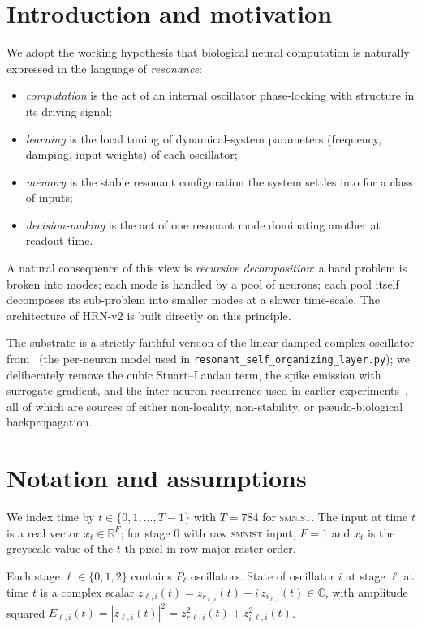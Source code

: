 \documentclass[11pt]{article}
\newcommand{\R}{\mathbb{R}}
\newcommand{\C}{\mathbb{C}}
\newcommand{\zr}{z_r}
\newcommand{\zi}{z_i}
\begin{document}
\section{Introduction and motivation}

We adopt the working hypothesis that biological neural computation is
naturally expressed in the language of \emph{resonance}:
\begin{itemize}[itemsep=2pt]
\item \emph{computation} is the act of an internal oscillator phase-locking
      with structure in its driving signal;
\item \emph{learning} is the local tuning of dynamical-system parameters
      (frequency, damping, input weights) of each oscillator;
\item \emph{memory} is the stable resonant configuration the system
      settles into for a class of inputs;
\item \emph{decision-making} is the act of one resonant mode dominating
      another at readout time.
\end{itemize}

A natural consequence of this view is \emph{recursive decomposition}:
a hard problem is broken into modes; each mode is handled by a pool of
neurons; each pool itself decomposes its sub-problem into smaller modes
at a slower time-scale. The architecture of HRN-v2 is built directly on
this principle.

The substrate is a strictly faithful version of the linear damped complex
oscillator from~\cite{pubv3} (the per-neuron model used in
\texttt{resonant\_self\_organizing\_layer.py}); we deliberately remove
the cubic Stuart--Landau term, the spike emission with surrogate
gradient, and the inter-neuron recurrence used in earlier
experiments~\cite{pubv4_v1}, all of which are sources of either
non-locality, non-stability, or pseudo-biological backpropagation.

\section{Notation and assumptions}\label{sec:notation}

We index time by $t \in \{0, 1, \ldots, T-1\}$ with $T = 784$ for
\textsc{smnist}. The input at time $t$ is a real vector $x_t \in \R^F$;
for stage 0 with raw \textsc{smnist} input, $F = 1$ and $x_t$ is the
greyscale value of the $t$-th pixel in row-major raster order.

Each stage $\ell \in \{0, 1, 2\}$ contains $P_\ell$ oscillators. State
of oscillator $i$ at stage $\ell$ at time $t$ is a complex scalar
$z_{\ell, i}(t) = \zr_{\ell, i}(t) + i\,\zi_{\ell, i}(t) \in \C$, with
amplitude squared $E_{\ell, i}(t) = |z_{\ell, i}(t)|^2 = \zr^2_{\ell,i}(t)
+ \zi^2_{\ell,i}(t)$.
\end{document}
